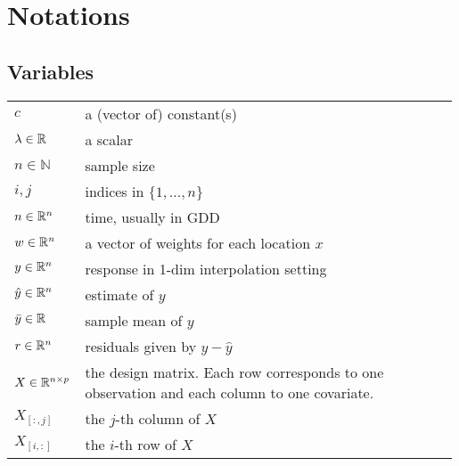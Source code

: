 \chapter*{Notations}
\label{c:Notation}

\section*{Variables}

\renewcommand{\arraystretch}{1.3} %
\begin{longtable}{p{0.12\linewidth} p{0.87\linewidth}}
$c$		& a (vector of) constant(s)\\
$\lambda \in \mathbb{R}$		& a scalar\\
$n\in \mathbb{N}$		& sample size\\
$i,j$		& indices in $\{1,\dots,n\}$\\
$n\in \mathbb{R}^n$		& time, usually in GDD\\
$w \in \mathbb{R}^n$		& a vector of weights for each location $x$\\
$y\in \mathbb{R}^n$		& response in 1-dim interpolation setting\\
$\hat y\in \mathbb{R}^n$		& estimate of $y$\\
$\bar y\in \mathbb{R}$		& sample mean of $y$\\
$r \in \mathbb{R}^n$		& residuals given by $y - \hat y$\\
$X\in\mathbb{R}^{n\times p}$ & the design matrix. Each row corresponds to one observation and each column to one covariate.\\
$X_{[:,j]}$ 	& the $j$-th column of $X$\\
$X_{[i,:]}$ 	& the $i$-th row of $X$\\
\end{longtable}

